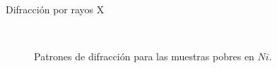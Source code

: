 \documentclass[11pt]{beamer}
\begin{document}
\begin{frame}{Difracción por rayos X}
\begin{figure}[H]
					 \\
					\caption*{Patrones de difracción para las muestras pobres en $Ni$.}
				\end{figure}		
			\end{frame}
	
\end{document}
